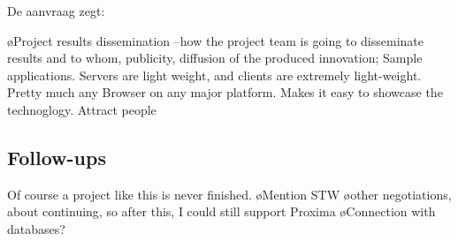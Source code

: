 De aanvraag zegt:

\bl
\o Project results dissemination --how the project team is going to disseminate results and to whom, publicity, diffusion of the produced innovation;
\el
Sample applications. Servers are light weight, and clients are extremely light-weight. Pretty much any Browser on any major platform. Makes it easy to showcase the technoglogy. Attract people


\subsection{Follow-ups}

Of course a project like this is never finished.
\bl
\o Mention STW
\o other negotiations, about continuing, so after this, I could still support Proxima
\o Connection with databases?
\el


